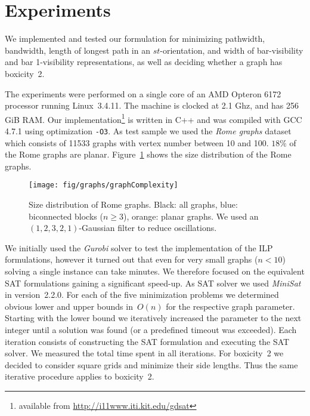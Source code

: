 \documentclass[runningheads]{llncs}
\newcounter{constr}
\begin{document}
\section{Experiments}\label{sec:exp}
We implemented and tested our formulation for minimizing pathwidth, bandwidth,
length of longest path in an $st$-orientation, and width of
bar-visibility and bar 1-visibility representations, as well as
deciding whether a graph has boxicity~2.
\par

The experiments were performed on a single core of an
AMD Opteron 6172 processor running Linux~3.4.11. The machine is
clocked at 2.1 Ghz, and has 256 GiB RAM. Our
implementation\footnote{available from
\url{http://i11www.iti.kit.edu/gdsat}} is written
in C++ and was compiled with GCC 4.7.1 using optimization
\texttt{-O3}. As test sample we used the \emph{Rome graphs} dataset
\cite{rome} which consists of 11533 graphs with vertex number between
10 and 100. $18\%$ of the Rome graphs are planar.
Figure~\ref{fig:size-distr} shows
the size distribution of the Rome graphs.

\begin{figure}[tbp]
\centering
  \texttt{[image: fig/graphs/graphComplexity]}
 \caption{\small Size distribution of Rome graphs.
 Black: all graphs,
 blue: biconnected blocks ($n{\geq}3$),
 orange: planar graphs. We used an $(1,2,3,2,1)$-Gaussian filter to
reduce oscillations.  
 }
 \label{fig:size-distr}
\end{figure}


We initially used the \emph{Gurobi} solver \cite{gurobi} to
test the implementation of the ILP formulations, however it turned out
that even for very small graphs ($n<10$) solving a single instance can
take minutes. We therefore focused on the equivalent SAT
formulations gaining a significant speed-up. As SAT solver we used
\emph{MiniSat}~\cite{minisat} in version~2.2.0.  
For each of the five minimization problems we determined obvious lower and upper bounds in~$O(n)$ for the respective graph parameter. Starting with the lower bound we iteratively increased the parameter to the next integer until a solution was found (or a predefined timeout was exceeded). Each iteration consists of constructing the SAT formulation 
and executing the SAT solver. We measured the total time spent in all iterations.
For boxicity~2 we decided to consider square grids and minimize
their side lengths. Thus the same iterative procedure applies to boxicity~2.
\end{document}
